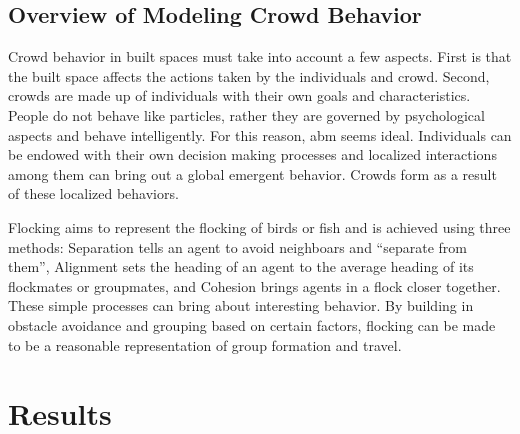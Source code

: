 \documentclass{article}
\begin{document}
\subsection{Overview of Modeling Crowd Behavior}
Crowd behavior in built spaces must take into account a few
aspects. First is that the built space affects the actions taken by
the individuals and crowd. Second, crowds are made up of individuals
with their own goals and characteristics. People do not behave like
particles, rather they are governed by psychological aspects and
behave intelligently. For this reason, abm seems ideal. Individuals
can be endowed with their own decision making processes and localized
interactions among them can bring out a global emergent
behavior. Crowds form as a result of these localized behaviors.

Flocking aims to represent the flocking of birds or fish and is
achieved using three methods: Separation tells an agent to avoid
neighboars and ``separate from them'', Alignment sets the heading of
an agent to the average heading of its flockmates or groupmates, and
Cohesion brings agents in a flock closer together. These simple
processes can bring about interesting behavior. By building in
obstacle avoidance and grouping based on certain factors, flocking can
be made to be a reasonable representation of group formation and travel.

\section{Results}
\end{document}
